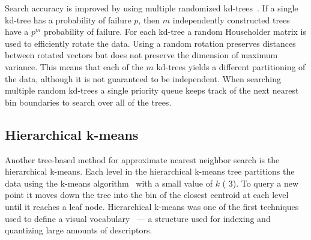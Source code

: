             Search accuracy is improved by using multiple randomized
              kd-trees~\cite{silpa_anan_optimised_2008}.
            If a single kd-tree has a probability of failure $p$, then
              $m$ independently constructed trees have a $p^m$
              probability of failure.
            For each kd-tree a random Householder matrix is used to
              efficiently rotate the data.
            Using a random rotation preserves distances between rotated
              vectors but does not preserve the dimension of maximum
              variance.
            This means that each of the $m$ kd-trees yields a different
              partitioning of the data, although it is not guaranteed to
              be independent.
            When searching multiple random kd-trees a single priority
              queue keeps track of the next nearest bin boundaries to
              search over all of the trees.


        \subsection{Hierarchical k-means}
            Another tree-based method for approximate nearest neighbor
              search is the hierarchical k-means.
            Each level in the hierarchical k-means tree partitions the
              data using the k-means algorithm~\cite{lloyd_least_1982}
              with a small value of $k$ (\eg{} 3).
            To query a new point it moves down the tree into the bin of
              the closest centroid at each level until it reaches a leaf
              node.
            Hierarchical k-means was one of the first techniques used
              to define a visual vocabulary~\cite{nister_scalable_2006}
              --- a structure used for indexing and quantizing large
              amounts of descriptors.
        
